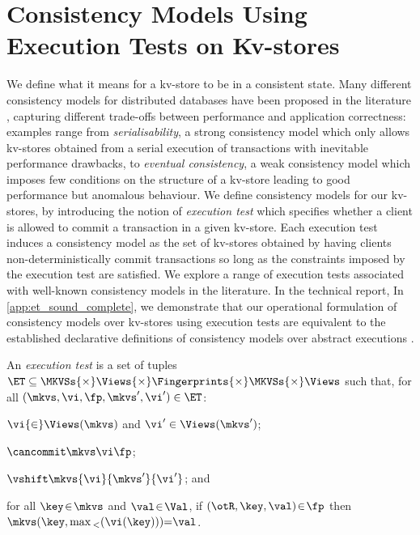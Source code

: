 \section{Consistency Models Using Execution Tests on Kv-stores}
\label{sec:cm}
We define what it means for a kv-store 
to be in a consistent state. Many different consistency models for
distributed databases have 
been proposed in the literature
\cite{principle-eventual-consistency,rola,redblue,PSI,si},
capturing different trade-offs 
between  performance and application
correctness: examples range from  \emph{serialisability}, a strong
consistency model which only allows kv-stores 
obtained  from a serial execution of transactions
with inevitable performance drawbacks, to  \emph{eventual consistency},  a weak consistency model
which imposes few conditions on the structure of a kv-store leading to
good performance but anomalous behaviour.
We define consistency models for our kv-stores,
by introducing the notion of 
\emph{execution test} which specifies  whether a client is allowed to commit a transaction in a given 
kv-store. Each execution test induces a consistency model as the set of kv-stores obtained 
by having clients non-deterministically commit transactions so long as  the constraints 
imposed by the execution test are satisfied.
We explore a range of execution tests  associated with well-known consistency models in the literature. 
\ifTechRepEdits%
In the technical report,
\else%
In \cref{app:et_sound_complete},
\fi
we demonstrate that our operational
formulation of  consistency models over kv-stores using execution
tests are  equivalent to the established declarative definitions of
consistency models over abstract executions \cite{ev_transactions,framework-concur}.

\SpaceAboveDef
\begin{definition}
\label{def:execution.test}
An \emph{execution test} is a set of tuples
\(\ET \subseteq \MKVSs {\times} \Views {\times} \allowbreak \Fingerprints {\times} \MKVSs {\times} \Views\) 
such that, for all \((\mkvs, \vi, \fp, \mkvs', \vi') \in \ET\): 
\begin{enumerate*}
	\item \(\vi {\in}  \allowbreak \Views(\mkvs)\) and \(\vi' \in \Views(\mkvs')\); 
	\item \(\cancommit \mkvs \vi \fp\); 
	\item \(\vshift \mkvs {\allowbreak \vi} {\mkvs'} {\vi'}\); and 
	\item for all \(\key \!\in\! \mkvs\) and \(\val \!\in\! \Val\), if \((\otR, \key, \val) \!\in\! \fp \) then \(	\mkvs(\key, \max{}_{<}(\vi(\key))) {=} \val   \).
\end{enumerate*}
\end{definition}
\SpaceBelowDef

